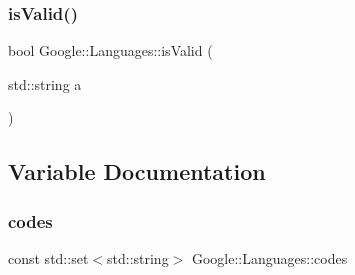 \subsubsection{\texorpdfstring{is\+Valid()}{isValid()}}
{\footnotesize\ttfamily bool Google\+::\+Languages\+::is\+Valid (\begin{DoxyParamCaption}\item[{std\+::string}]{a }\end{DoxyParamCaption})}



\subsection{Variable Documentation}
\mbox{\label{a00042_a7323c7ef1fa5d84f505aa504095b788a}} 
\subsubsection{\texorpdfstring{codes}{codes}}
{\footnotesize\ttfamily const std\+::set$<$std\+::string$>$ Google\+::\+Languages\+::codes}

